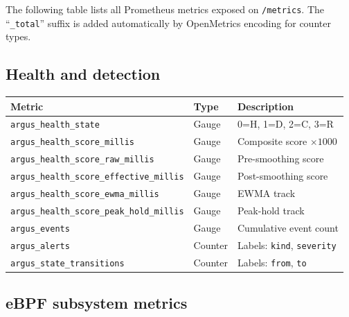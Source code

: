 \documentclass[11pt]{article}
\begin{document}
The following table lists all Prometheus metrics exposed on
\texttt{/metrics}. The ``\texttt{\_total}'' suffix is added automatically
by OpenMetrics encoding for counter types.

\subsection{Health and detection}

\begin{center}
\small
\begin{tabular}{lll}
\toprule
Metric & Type & Description \\
\midrule
\texttt{argus\_health\_state}               & Gauge   & 0=H, 1=D, 2=C, 3=R \\
\texttt{argus\_health\_score\_millis}        & Gauge   & Composite score $\times 1000$ \\
\texttt{argus\_health\_score\_raw\_millis}   & Gauge   & Pre-smoothing score \\
\texttt{argus\_health\_score\_effective\_millis} & Gauge & Post-smoothing score \\
\texttt{argus\_health\_score\_ewma\_millis}  & Gauge   & EWMA track \\
\texttt{argus\_health\_score\_peak\_hold\_millis} & Gauge & Peak-hold track \\
\texttt{argus\_events}                       & Gauge   & Cumulative event count \\
\texttt{argus\_alerts}                       & Counter & Labels: \texttt{kind}, \texttt{severity} \\
\texttt{argus\_state\_transitions}           & Counter & Labels: \texttt{from}, \texttt{to} \\
\bottomrule
\end{tabular}
\end{center}

\subsection{eBPF subsystem metrics}
\end{document}

